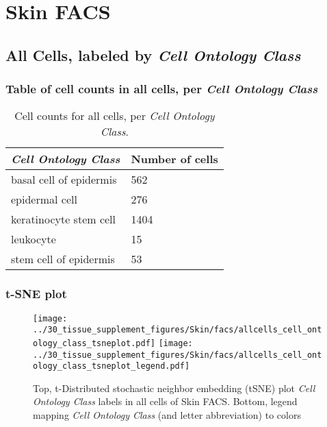 \clearpage
\section{Skin FACS}

\subsection{All Cells, labeled by \emph{Cell Ontology Class}}
\subsubsection{Table of cell counts in all cells, per \emph{Cell Ontology Class}}\begin{table}[h]
\centering
\label{my-label}
\begin{tabular}{@{}ll@{}}
\toprule

\emph{Cell Ontology Class}& Number of cells \\ \midrule
basal cell of epidermis & 562 \\

epidermal cell & 276 \\

keratinocyte stem cell & 1404 \\

leukocyte & 15 \\

stem cell of epidermis & 53 \\
\bottomrule
\end{tabular}
\caption{Cell counts for all cells, per \emph{Cell Ontology Class}.}
\end{table}

\clearpage
\subsubsection{t-SNE plot}
\begin{figure}[h]
\centering
\texttt{[image: ../30\_tissue\_supplement\_figures/Skin/facs/allcells\_cell\_ontology\_class\_tsneplot.pdf]}
\texttt{[image: ../30\_tissue\_supplement\_figures/Skin/facs/allcells\_cell\_ontology\_class\_tsneplot\_legend.pdf]}
\caption{Top, t-Distributed stochastic neighbor embedding (tSNE) plot  \emph{Cell Ontology Class} labels in all cells of Skin FACS. Bottom, legend mapping \emph{Cell Ontology Class} (and letter abbreviation) to colors}
\end{figure}


\clearpage

